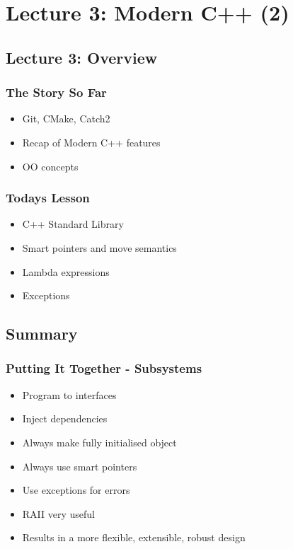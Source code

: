 \hypertarget{lecture-3-modern-c-2}{%
\section{Lecture 3: Modern C++ (2)}\label{lecture-3-modern-c-2}}

\hypertarget{lecture-3-overview}{%
\subsection{Lecture 3: Overview}\label{lecture-3-overview}}

\hypertarget{the-story-so-far-1}{%
\subsubsection{The Story So Far}\label{the-story-so-far-1}}

\begin{itemize}
\tightlist
\item
  Git, CMake, Catch2
\item
  Recap of Modern C++ features
\item
  OO concepts
\end{itemize}

\hypertarget{todays-lesson-1}{%
\subsubsection{Todays Lesson}\label{todays-lesson-1}}

\begin{itemize}
\tightlist
\item
  C++ Standard Library
\item
  Smart pointers and move semantics
\item
  Lambda expressions
\item
  Exceptions
\end{itemize}

\hypertarget{summary}{%
\subsection{Summary}\label{summary}}

\hypertarget{putting-it-together---subsystems}{%
\subsubsection{Putting It Together -
Subsystems}\label{putting-it-together---subsystems}}

\begin{itemize}
\tightlist
\item
  Program to interfaces
\item
  Inject dependencies
\item
  Always make fully initialised object
\item
  Always use smart pointers
\item
  Use exceptions for errors
\item
  RAII very useful
\item
  Results in a more flexible, extensible, robust design
\end{itemize}

